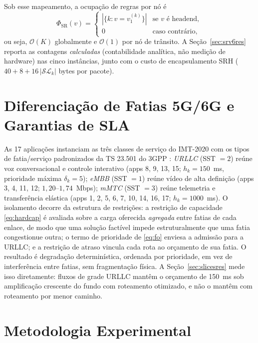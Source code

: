 \documentclass[journal]{IEEEtran}
\begin{document}
Sob esse mapeamento, a ocupação de regras por nó é
\begin{equation}
\Phi_{\mathrm{SR}}(v)=\begin{cases}
|\{k: v=v^{(k)}_1\}| & \text{se $v$ é headend},\\
0 & \text{caso contrário},
\end{cases}
\label{eq:srstate}
\end{equation}
ou seja, $\mathcal{O}(K)$ globalmente e $\mathcal{O}(1)$ por nó de
trânsito. A Seção~\ref{sec:srv6res} reporta as contagens \emph{calculadas}
(contabilidade analítica, não medição de hardware) nas cinco instâncias,
junto com o custo de encapsulamento SRH
($40+8+16\,|\mathcal{SL}_k|$ bytes por pacote).

\section{Diferenciação de Fatias 5G/6G e Garantias de SLA}
\label{sec:slices}
As 17 aplicações instanciam as três classes de serviço do IMT-2020
\cite{itu-m2083} com os tipos de fatia/serviço padronizados da TS 23.501 do
3GPP \cite{3gpp-ts23501}: \emph{URLLC} (SST $=2$) reúne voz conversacional e
controle interativo (apps 8, 9, 13, 15; $h_k=150$~ms, prioridade máxima
$\delta_k=5$); \emph{eMBB} (SST $=1$) reúne vídeo de alta definição (apps 3,
4, 11, 12; $1{,}20$--$1{,}74$~Mbps); \emph{mMTC} (SST $=3$) reúne telemetria
e transferência elástica (apps 1, 2, 5, 6, 7, 10, 14, 16, 17;
$h_k=1000$~ms). O isolamento decorre da estrutura de restrições: a
restrição de capacidade \eqref{eq:hardcap} é avaliada sobre a carga
oferecida \emph{agregada} entre fatias de cada enlace, de modo que uma
solução factível impede estruturalmente que uma fatia congestionue outra; o
termo de prioridade de \eqref{eq:fo} enviesa a admissão para a URLLC; e a
restrição de atraso vincula cada rota ao orçamento de sua fatia. O
resultado é degradação determinística, ordenada por prioridade, em vez de
interferência entre fatias, sem fragmentação física. A
Seção~\ref{sec:slicesres} mede isso diretamente: fluxos de grade URLLC
mantêm o orçamento de 150~ms sob amplificação crescente do fundo com
roteamento otimizado, e não o mantêm com roteamento por menor caminho.

\section{Metodologia Experimental}
\label{sec:setup}
\end{document}
